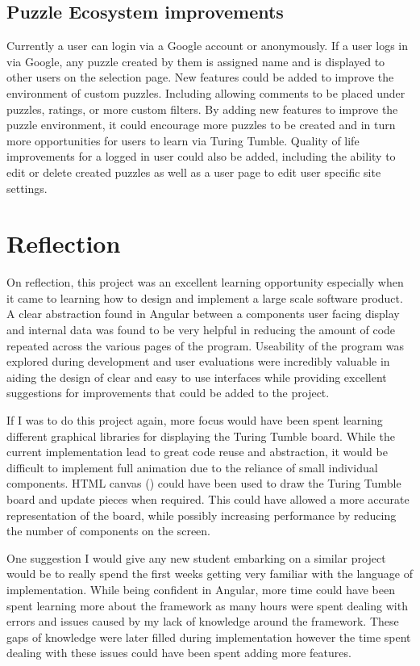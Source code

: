 \documentclass{l4proj}
\begin{document}
\subsection{Puzzle Ecosystem improvements}
Currently a user can login via a Google account or anonymously. If a user logs in via Google, any puzzle created by them is assigned name and is displayed to other users on the selection page. New features could be added to improve the environment of custom puzzles. Including allowing comments to be placed under puzzles, ratings, or more custom filters. By adding new features to improve the puzzle environment, it could encourage more puzzles to be created and in turn more opportunities for users to learn via Turing Tumble. Quality of life improvements for a logged in user could also be added, including the ability to edit or delete created puzzles as well as a user page to edit user specific site settings.

\section{Reflection}
On reflection, this project was an excellent learning opportunity especially when it came to learning how to design and implement a large scale software product. A clear abstraction found in Angular between a components user facing display and internal data was found to be very helpful in reducing the amount of code repeated across the various pages of the program. Useability of the program was explored during development and user evaluations were incredibly valuable in aiding the design of clear and easy to use interfaces while providing excellent suggestions for improvements that could be added to the project.

If I was to do this project again, more focus would have been spent learning different graphical libraries for displaying the Turing Tumble board. While the current implementation lead to great code reuse and abstraction, it would be difficult to implement full animation due to the reliance of small individual components. HTML canvas (\cite{html_canvas}) could have been used to draw the Turing Tumble board and update pieces when required. This could have allowed a more accurate representation of the board, while possibly increasing performance by reducing the number of components on the screen.

One suggestion I would give any new student embarking on a similar project would be to really spend the first weeks getting very familiar with the language of implementation. While being confident in Angular, more time could have been spent learning more about the framework as many hours were spent dealing with errors and issues caused by my lack of knowledge around the framework. These gaps of knowledge were later filled during implementation however the time spent dealing with these issues could have been spent adding more features. 
\end{document}
